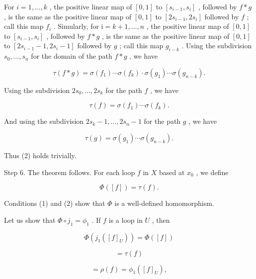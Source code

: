 For \(i = 1,\ldots ,k\) , the positive linear map of \(\left\lbrack  {0,1}\right\rbrack\) to \(\left\lbrack  {{s}_{i - 1},{s}_{i}}\right\rbrack\) , followed by \(f * g\) , is the same as the positive linear map of \(\left\lbrack  {0,1}\right\rbrack\) to \(\left\lbrack  {2{s}_{i - 1},2{s}_{i}}\right\rbrack\) followed by \(f\) ; call this map \({f}_{i}\) . Simularly, for \(\mathrm{i} = k + 1,\ldots ,n\) , the positive linear map of \(\left\lbrack  {0,1}\right\rbrack\) to \(\left\lbrack  {{s}_{i - 1},{s}_{i}}\right\rbrack\) , followed by \(f * g\) , is the same as the positive linear map of \(\left\lbrack  {0,1}\right\rbrack\) to \(\left\lbrack  {2{s}_{i - 1} - 1,2{s}_{i} - 1}\right\rbrack\) followed by \(g\) ; call this map \({g}_{i - k}\) . Using the subdivision \({s}_{0},\ldots ,{s}_{n}\) for the domain of the path \(f * g\) , we have

\[
\tau \left( {f * g}\right)  = \sigma \left( {f}_{1}\right) \cdots \sigma \left( {f}_{k}\right)  \cdot  \sigma \left( {g}_{1}\right) \cdots \sigma \left( {g}_{n - k}\right) .
\]

Using the subdivision \(2{s}_{0},\ldots ,2{s}_{k}\) for the path \(f\) , we have

\[
\tau \left( f\right)  = \sigma \left( {f}_{1}\right) \cdots \sigma \left( {f}_{k}\right) .
\]

And using the subdivision \(2{s}_{k} - 1,\ldots ,2{s}_{n} - 1\) for the path \(g\) , we have

\[
\tau \left( g\right)  = \sigma \left( {g}_{1}\right) \cdots \sigma \left( {g}_{n - k}\right) .
\]

Thus (2) holds trivially.

Step 6. The theorem follows. For each loop \(f\) in \(X\) based at \({x}_{0}\) , we define

\[
\Phi \left( \left\lbrack  f\right\rbrack  \right)  = \tau \left( f\right) .
\]

Conditions (1) and (2) show that \(\Phi\) is a well-defined homomorphism.

Let us show that \(\Phi  \circ  {j}_{1} = {\phi }_{1}\) . If \(f\) is a loop in \(U\) , then

\[
\Phi \left( {{j}_{1}\left( {\left\lbrack  f\right\rbrack  }_{U}\right) }\right)  = \Phi \left( \left\lbrack  f\right\rbrack  \right)
\]

\[
= \tau \left( f\right)
\]

\[
= \rho \left( f\right)  = {\phi }_{1}\left( {\left\lbrack  f\right\rbrack  }_{U}\right) ,
\]

